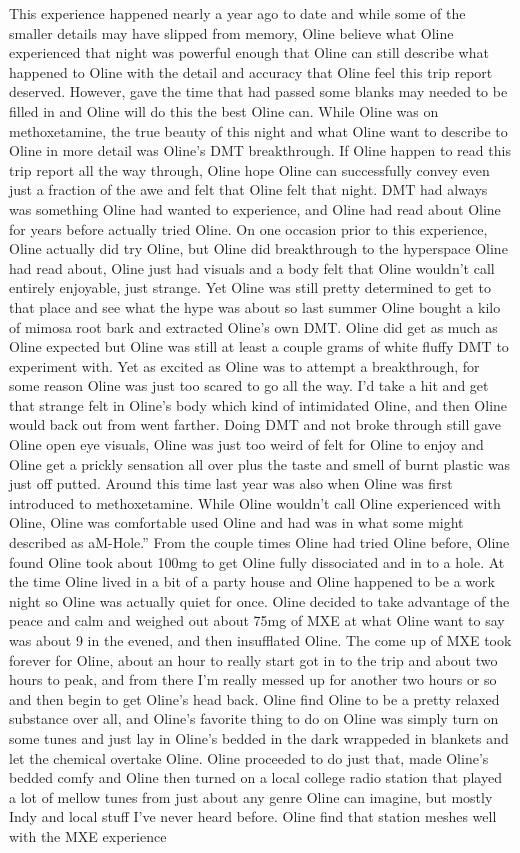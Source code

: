 \documentclass[12pt]{book}
\begin{document}
This experience happened nearly a year ago to date and while some of the smaller details may have slipped from memory, Oline believe what Oline experienced that night was powerful enough that Oline can still describe what happened to Oline with the detail and accuracy that Oline feel this trip report deserved. However, gave the time that had passed some blanks may needed to be filled in and Oline will do this the best Oline can. While Oline was on methoxetamine, the true beauty of this night and what Oline want to describe to Oline in more detail was Oline's DMT breakthrough. If Oline happen to read this trip report all the way through, Oline hope Oline can successfully convey even just a fraction of the awe and felt that Oline felt that night. DMT had always was something Oline had wanted to experience, and Oline had read about Oline for years before actually tried Oline. On one occasion prior to this experience, Oline actually did try Oline, but Oline did breakthrough to the hyperspace Oline had read about, Oline just had visuals and a body felt that Oline wouldn't call entirely enjoyable, just strange. Yet Oline was still pretty determined to get to that place and see what the hype was about so last summer Oline bought a kilo of mimosa root bark and extracted Oline's own DMT. Oline did get as much as Oline expected but Oline was still at least a couple grams of white fluffy DMT to experiment with. Yet as excited as Oline was to attempt a breakthrough, for some reason Oline was just too scared to go all the way. I'd take a hit and get that strange felt in Oline's body which kind of intimidated Oline, and then Oline would back out from went farther. Doing DMT and not broke through still gave Oline open eye visuals, Oline was just too weird of felt for Oline to enjoy and Oline get a prickly sensation all over plus the taste and smell of burnt plastic was just off putted. Around this time last year was also when Oline was first introduced to methoxetamine. While Oline wouldn't call Oline experienced with Oline, Oline was comfortable used Oline and had was in what some might described as aM-Hole.'' From the couple times Oline had tried Oline before, Oline found Oline took about 100mg to get Oline fully dissociated and in to a hole. At the time Oline lived in a bit of a party house and Oline happened to be a work night so Oline was actually quiet for once. Oline decided to take advantage of the peace and calm and weighed out about 75mg of MXE at what Oline want to say was about 9 in the evened, and then insufflated Oline. The come up of MXE took forever for Oline, about an hour to really start got in to the trip and about two hours to peak, and from there I'm really messed up for another two hours or so and then begin to get Oline's head back. Oline find Oline to be a pretty relaxed substance over all, and Oline's favorite thing to do on Oline was simply turn on some tunes and just lay in Oline's bedded in the dark wrappeded in blankets and let the chemical overtake Oline. Oline proceeded to do just that, made Oline's bedded comfy and Oline then turned on a local college radio station that played a lot of mellow tunes from just about any genre Oline can imagine, but mostly Indy and local stuff I've never heard before. Oline find that station meshes well with the MXE experience 
\end{document}
